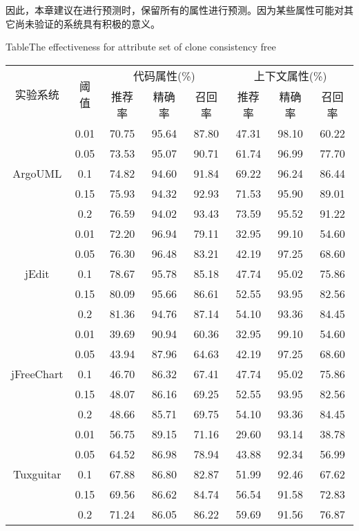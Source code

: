 因此，本章建议在进行预测时，保留所有的属性进行预测。因为某些属性可能对其它尚未验证的系统具有积极的意义。

\begin{table}[htbp]
{Table$\!$}{The effectiveness for attribute set of clone consistency free}
\vspace{0.5em}
\centering
\wuhao
\begin{tabular}{cccccccc}
\toprule[1.5pt]
\multirow{2}{*}{实验系统}&\multirow{2}{*}{阈值}&\multicolumn{3}{c}{代码属性(\%)}&\multicolumn{3}{c}{上下文属性(\%)}\\
\cline{3-8}
&&推荐率&精确率&召回率&推荐率&精确率&召回率\\
\midrule[1pt]
\multirow{5}{*}{ArgoUML}
&0.01&	70.75&	95.64&	87.80&	47.31&	98.10&	60.22\\
&0.05&	73.53&	95.07&	90.71&	61.74&	96.99&	77.70\\
&0.1&	74.82&	94.60&	91.84&	69.22&	96.24&	86.44\\
&0.15&	75.93&	94.32&	92.93&	71.53&	95.90&	89.01\\
&0.2&	76.59&	94.02&	93.43&	73.59&	95.52&	91.22\\
\hline
\multirow{5}{*}{jEdit}
&0.01&	72.20&    96.94&	79.11&	32.95&	99.10&	54.60\\
&0.05&	76.30&	96.48&	83.21&	42.19&	97.25&	68.60\\
&0.1&	78.67&	95.78&	85.18&	47.74&	95.02&	75.86\\
&0.15&	80.09&	95.66&	86.61&	52.55&	93.95&	82.56\\
&0.2&	81.36&	94.76&	87.14&	54.10&	93.36&	84.45\\
\hline
\multirow{5}{*}{jFreeChart}
&0.01&	39.69&	90.94&	60.36&	32.95&	99.10&	54.60\\
&0.05&	43.94&	87.96&	64.63&	42.19&	97.25&	68.60\\
&0.1&	46.70&	86.32&	67.41&	47.74&	95.02&	75.86\\
&0.15&	48.07&	86.16&	69.25&	52.55&	93.95&	82.56\\
&0.2&	48.66&	85.71&	69.75&	54.10&	93.36&	84.45\\
\hline
\multirow{5}{*}{Tuxguitar}
&0.01&	56.75&	89.15&	71.16&	29.60&	93.14&	38.78\\
&0.05&	64.52&	86.98&	78.94&	43.88&	92.34&	56.99\\
&0.1&	67.88&	86.80&	82.87&	51.99&	92.46&	67.62\\
&0.15&	69.56&	86.62&	84.74&	56.54&	91.58&	72.83\\
&0.2&	71.24&	86.05&	86.22&	59.69&	91.56&	76.87\\
\bottomrule[1.5pt]
\end{tabular}
\end{table}

